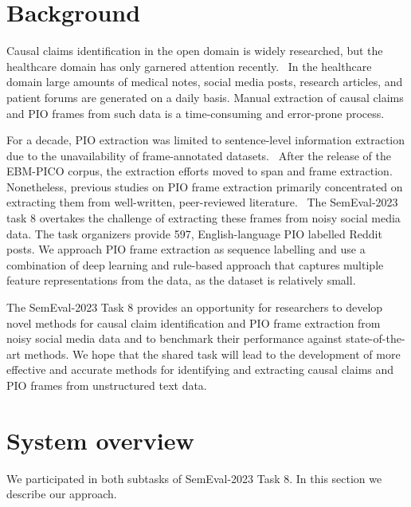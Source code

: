 \documentclass[11pt]{article}
\begin{document}
\section{Background}
\label{background}
%
Causal claims identification in the open domain is widely researched, but the healthcare domain has only garnered attention recently.~\cite{mueller2018extracting,wang-etal-2019-identifying,parveen-etal-2021-automatic,islam-etal-2021-identifying}
In the healthcare domain large amounts of medical notes, social media posts, research articles, and patient forums are generated on a daily basis.
Manual extraction of causal claims and PIO frames from such data is a time-consuming and error-prone process.


For a decade, PIO extraction was limited to sentence-level information extraction due to the unavailability of frame-annotated datasets.~\cite{boudin2010combining,jin2018pico}
After the release of the EBM-PICO corpus, the extraction efforts moved to span and frame extraction.~\cite{nye2018corpus}
Nonetheless, previous studies on PIO frame extraction primarily concentrated on extracting them from well-written, peer-reviewed literature.~\cite{brockmeier2019improving,zhang2020unlocking,dhrangadhariya2021end}
The SemEval-2023 task 8 overtakes the challenge of extracting these frames from noisy social media data.
The task organizers provide 597, English-language PIO labelled Reddit posts.
We approach PIO frame extraction as sequence labelling and use a combination of deep learning and rule-based approach that captures multiple feature representations from the data, as the dataset is relatively small.


The SemEval-2023 Task 8 provides an opportunity for researchers to develop novel methods for causal claim identification and PIO frame extraction from noisy social media data and to benchmark their performance against state-of-the-art methods.
We hope that the shared task will lead to the development of more effective and accurate methods for identifying and extracting causal claims and PIO frames from unstructured text data.
%
%
%
\section{System overview}
\label{system_over}
%
We participated in both subtasks of SemEval-2023 Task 8. 
In this section we describe our approach.
%
%
%
\end{document}
